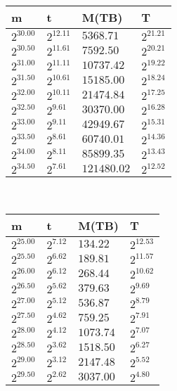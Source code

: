 \begin{tabular}{llll}
m & t & M(TB) & T \\ \hline
$2^{30.00}$ & $2^{12.11}$ & $5368.71$ & $2^{21.21}$ \\
$2^{30.50}$ & $2^{11.61}$ & $7592.50$ & $2^{20.21}$ \\
$2^{31.00}$ & $2^{11.11}$ & $10737.42$ & $2^{19.22}$ \\
$2^{31.50}$ & $2^{10.61}$ & $15185.00$ & $2^{18.24}$ \\
$2^{32.00}$ & $2^{10.11}$ & $21474.84$ & $2^{17.25}$ \\
$2^{32.50}$ & $2^{9.61}$ & $30370.00$ & $2^{16.28}$ \\
$2^{33.00}$ & $2^{9.11}$ & $42949.67$ & $2^{15.31}$ \\
$2^{33.50}$ & $2^{8.61}$ & $60740.01$ & $2^{14.36}$ \\
$2^{34.00}$ & $2^{8.11}$ & $85899.35$ & $2^{13.43}$ \\
$2^{34.50}$ & $2^{7.61}$ & $121480.02$ & $2^{12.52}$ \\
\end{tabular}
 \ 
\begin{tabular}{llll}
m & t & M(TB) & T \\ \hline
$2^{25.00}$ & $2^{7.12}$ & $134.22$ & $2^{12.53}$ \\
$2^{25.50}$ & $2^{6.62}$ & $189.81$ & $2^{11.57}$ \\
$2^{26.00}$ & $2^{6.12}$ & $268.44$ & $2^{10.62}$ \\
$2^{26.50}$ & $2^{5.62}$ & $379.63$ & $2^{9.69}$ \\
$2^{27.00}$ & $2^{5.12}$ & $536.87$ & $2^{8.79}$ \\
$2^{27.50}$ & $2^{4.62}$ & $759.25$ & $2^{7.91}$ \\
$2^{28.00}$ & $2^{4.12}$ & $1073.74$ & $2^{7.07}$ \\
$2^{28.50}$ & $2^{3.62}$ & $1518.50$ & $2^{6.27}$ \\
$2^{29.00}$ & $2^{3.12}$ & $2147.48$ & $2^{5.52}$ \\
$2^{29.50}$ & $2^{2.62}$ & $3037.00$ & $2^{4.80}$ \\
\end{tabular}
 \ 
